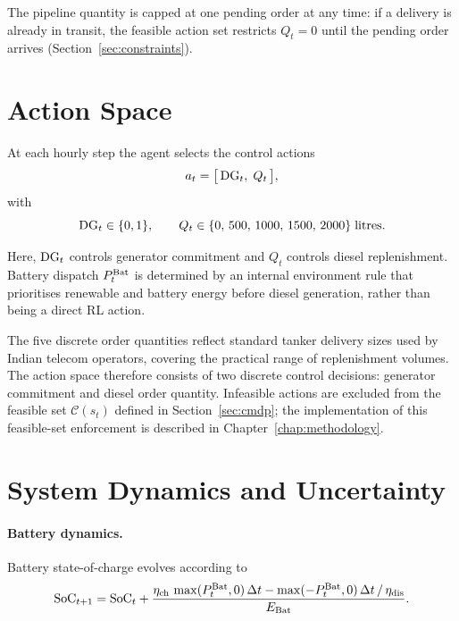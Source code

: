 The pipeline quantity is capped at one pending order at any time: if a
delivery is already in transit, the feasible action set restricts $Q_t = 0$
until the pending order arrives (Section~\ref{sec:constraints}).

\section{Action Space}
\label{sec:action}

At each hourly step the agent selects the control actions
\begin{equation}
a_t = \bigl[\,
  \mathrm{DG}_t,\;
  Q_t
\,\bigr],
\label{eq:action}
\end{equation}
with
\[
\mathrm{DG}_t \in \{0,1\}, \qquad
Q_t \in \{0,\,500,\,1000,\,1500,\,2000\}\;\text{litres.}
\]

Here, $\mathrm{DG}_t$ controls generator commitment and $Q_t$ controls diesel
replenishment. Battery dispatch $P_t^{\mathrm{Bat}}$ is determined by an
internal environment rule that prioritises renewable and battery energy
before diesel generation, rather than being a direct RL action.

The five discrete order quantities reflect standard tanker delivery sizes used
by Indian telecom operators, covering the practical range of replenishment
volumes. The action space therefore consists of two discrete control
decisions: generator commitment and diesel order quantity. Infeasible
actions are excluded from the feasible set $\mathcal{C}(s_t)$ defined in
Section~\ref{sec:cmdp}; the implementation of this feasible-set
enforcement is described in Chapter~\ref{chap:methodology}.

\section{System Dynamics and Uncertainty}
\label{sec:dynamics}

\paragraph{Battery dynamics.}
Battery state-of-charge evolves according to
\begin{equation}
\mathrm{SoC}_{t+1} = \mathrm{SoC}_t
  + \frac{\eta_{\mathrm{ch}}\,\max(P_t^{\mathrm{Bat}},0)\,\Delta t
          - \max(-P_t^{\mathrm{Bat}},0)\,\Delta t\,/\,\eta_{\mathrm{dis}}}
         {E_{\mathrm{Bat}}}.
\label{eq:soc}
\end{equation}

